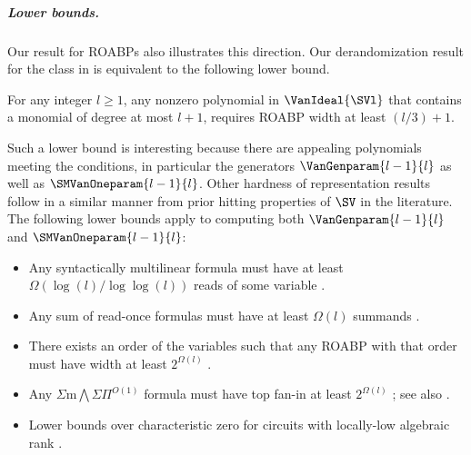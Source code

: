 \subparagraph{Lower bounds.}
Our result for ROABPs also illustrates this direction. Our derandomization result for the class in  is equivalent to the following lower bound. 
\begin{theorem}
  \label{thm.roabp.lb}
  For any integer $l \ge 1$, any nonzero polynomial in $\VanIdeal{\SVl}$ that contains a monomial of degree at most $l+1$, requires ROABP width at least $(l/3)+1$.
\end{theorem}
Such a lower bound is interesting because there are appealing polynomials meeting the conditions, in particular the generators $\VanGenparam{l-1}{l}$ as well as $\SMVanOneparam{l-1}{l}$.
Other hardness of representation results follow in a similar manner from prior hitting properties of $\SV$ in the literature.
The following lower bounds apply to computing both
\(\VanGenparam{l-1}{l}\) and \(\SMVanOneparam{l-1}{l}\):
\begin{itemize}
  \item
    Any syntactically multilinear formula must have at least
    \(\Omega(\log(l)/\log\log(l))\) reads of some variable
    \cite[Theorem~6.3]{AvMV2011}.
  \item
    Any sum of read-once formulas must have at least \(\Omega(l)\) summands
    \cite[Corollary~5.2]{MinahanVolkovich2017}.
  \item
    There exists an order of the variables such that any ROABP with that order
    must have width at least \(2^{\Omega(l)}\)
    \cite[Corollary~4.3]{FSS2014}.
  \item
    Any \(\Sigma\mathrm{m}\bigwedge\Sigma\Pi^{O(1)}\) formula must have top
    fan-in at least \(2^{\Omega(l)}\)
    \cite{Forbes2015}; 
    see also \cite[Lemma~5.12]{FSV2018}.
  \item
    Lower bounds over characteristic zero for circuits with locally-low
    algebraic rank
    \cite[Lemma~5.2]{KumarSaraf2016}.
\end{itemize}

